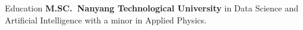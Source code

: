 \begin{rubric}{Education}
\entry*[2022 -- now]%
	\textbf{M.SC.~Nanyang Technological University} in Data Science and Artificial Intelligence with a minor in Applied Physics.
%
\end{rubric}